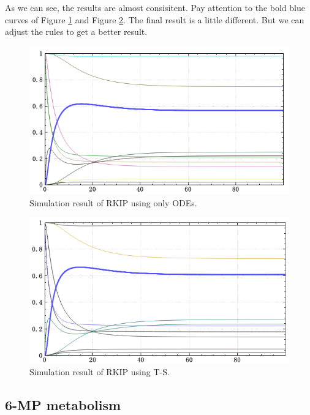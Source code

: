 \documentclass[journal,a4paper,onecolumn]{article}
\begin{document}
As we can see, the results are almost consisitent. Pay attention to the bold blue curves of Figure \ref{fig:Simulation result of RKIP using only ODEs.} and Figure \ref{fig:Simulation result of RKIP using T-S.}. The final result is a little different. But we can adjust the rules to get a better result.
\begin{figure}[!hbt]
	\begin{center}
		\includegraphics[width=\columnwidth]{fig29}
		\caption{Simulation result of RKIP using only ODEs.}
		\label{fig:Simulation result of RKIP using only ODEs.}
	\end{center}
\end{figure}
\begin{figure}[!hbt]
	\begin{center}
		\includegraphics[width=\columnwidth]{fig30}
		\caption{Simulation result of RKIP using T-S.}
		\label{fig:Simulation result of RKIP using T-S.}
	\end{center}
\end{figure}


\clearpage
\subsection{6-MP metabolism}
\end{document}
